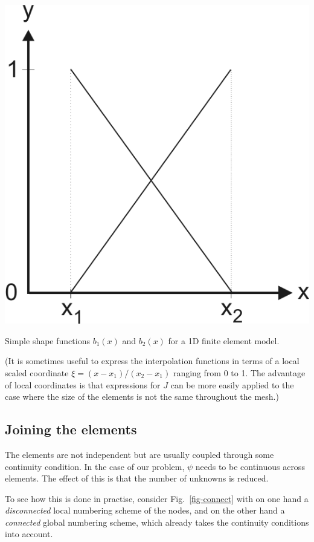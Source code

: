 \begin{marginfigure}
\centering
\includegraphics{numeric/figures/interpol}
\caption{Simple shape functions $b_1(x)$ and $b_2(x)$ for a 1D finite element model.}
\label{fig-shape}
\end{marginfigure}

(It is sometimes useful to express the interpolation functions in terms of a local scaled coordinate $\xi=(x-x_1)/(x_2-x_1)$ ranging from 0 to 1. The advantage of local coordinates is that expressions for $J$ can be more easily applied to the case where the size of the elements is not the same throughout the mesh.)

\subsection{Joining the elements}

The elements are not independent but are usually coupled through some continuity condition. In the case of our problem, $\psi$ needs to be continuous across elements. The effect of this is that the number of unknowns is reduced.

To see how this is done in practise, consider Fig.~\ref{fig-connect}  with on one hand a \emph{disconnected} local numbering scheme of the nodes, and on the other hand a \emph{connected} global numbering scheme, which already takes the continuity conditions into account.


